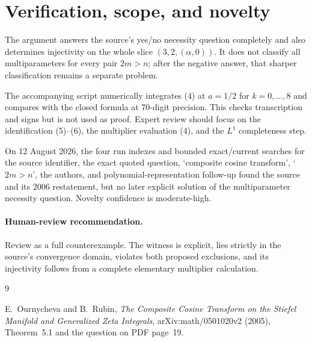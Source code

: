 \documentclass[11pt]{article}
\begin{document}
\section{Verification, scope, and novelty}

The argument answers the source's yes/no necessity question completely and
also determines injectivity on the whole slice
\((3,2,(\alpha,0))\).  It does not classify all multiparameters for every
pair \(2m>n\); after the negative answer, that sharper classification remains
a separate problem.

The accompanying script numerically integrates (4) at \(a=1/2\) for
\(k=0,\ldots,8\) and compares with the closed formula at 70-digit precision.
This checks transcription and signs but is not used as proof.  Expert review
should focus on the identification (5)--(6), the multiplier evaluation (4),
and the \(L^1\) completeness step.

On 12 August 2026, the four run indexes and bounded exact/current searches
for the source identifier, the exact quoted question, `composite cosine
transform', `\(2m>n\)', the authors, and polynomial-representation follow-up
found the source and its 2006 restatement, but no later explicit solution of
the multiparameter necessity question.  Novelty confidence is moderate-high.

\paragraph{Human-review recommendation.}
Review as a full counterexample.  The witness is explicit, lies strictly in
the source's convergence domain, violates both proposed exclusions, and its
injectivity follows from a complete elementary multiplier calculation.

\begin{thebibliography}{9}

E.~Ournycheva and B.~Rubin,
\emph{The Composite Cosine Transform on the Stiefel Manifold and Generalized
Zeta Integrals}, arXiv:math/0501020v2 (2005), Theorem~5.1 and the question on
PDF page~19.

\end{thebibliography}
\end{document}
